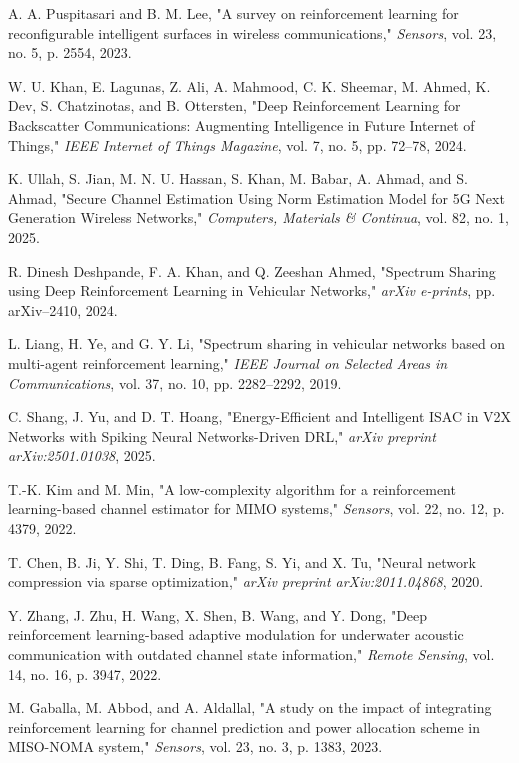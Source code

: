 \documentclass[journal,twocolumn]{IEEEtran}
\begin{document}
\begin{thebibliography}{20}
A. A. Puspitasari and B. M. Lee, "A survey on reinforcement learning for reconfigurable intelligent surfaces in wireless communications," \emph{Sensors}, vol. 23, no. 5, p. 2554, 2023.

W. U. Khan, E. Lagunas, Z. Ali, A. Mahmood, C. K. Sheemar, M. Ahmed, K. Dev, S. Chatzinotas, and B. Ottersten, "Deep Reinforcement Learning for Backscatter Communications: Augmenting Intelligence in Future Internet of Things," \emph{IEEE Internet of Things Magazine}, vol. 7, no. 5, pp. 72--78, 2024.

K. Ullah, S. Jian, M. N. U. Hassan, S. Khan, M. Babar, A. Ahmad, and S. Ahmad, "Secure Channel Estimation Using Norm Estimation Model for 5G Next Generation Wireless Networks," \emph{Computers, Materials \& Continua}, vol. 82, no. 1, 2025.

R. Dinesh Deshpande, F. A. Khan, and Q. Zeeshan Ahmed, "Spectrum Sharing using Deep Reinforcement Learning in Vehicular Networks," \emph{arXiv e-prints}, pp. arXiv--2410, 2024.

L. Liang, H. Ye, and G. Y. Li, "Spectrum sharing in vehicular networks based on multi-agent reinforcement learning," \emph{IEEE Journal on Selected Areas in Communications}, vol. 37, no. 10, pp. 2282--2292, 2019.

C. Shang, J. Yu, and D. T. Hoang, "Energy-Efficient and Intelligent ISAC in V2X Networks with Spiking Neural Networks-Driven DRL," \emph{arXiv preprint arXiv:2501.01038}, 2025.

T.-K. Kim and M. Min, "A low-complexity algorithm for a reinforcement learning-based channel estimator for MIMO systems," \emph{Sensors}, vol. 22, no. 12, p. 4379, 2022.

T. Chen, B. Ji, Y. Shi, T. Ding, B. Fang, S. Yi, and X. Tu, "Neural network compression via sparse optimization," \emph{arXiv preprint arXiv:2011.04868}, 2020.

Y. Zhang, J. Zhu, H. Wang, X. Shen, B. Wang, and Y. Dong, "Deep reinforcement learning-based adaptive modulation for underwater acoustic communication with outdated channel state information," \emph{Remote Sensing}, vol. 14, no. 16, p. 3947, 2022.

M. Gaballa, M. Abbod, and A. Aldallal, "A study on the impact of integrating reinforcement learning for channel prediction and power allocation scheme in MISO-NOMA system," \emph{Sensors}, vol. 23, no. 3, p. 1383, 2023.


\end{thebibliography}
\end{document}
